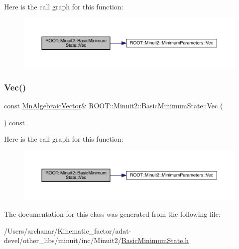 Here is the call graph for this function\+:
\nopagebreak
\begin{figure}[H]
\begin{center}
\leavevmode
\includegraphics[width=350pt]{d0/db1/classROOT_1_1Minuit2_1_1BasicMinimumState_a43ea742b5bd55d2c4e9d6b75308fb875_cgraph}
\end{center}
\end{figure}
\mbox{\label{classROOT_1_1Minuit2_1_1BasicMinimumState_a43ea742b5bd55d2c4e9d6b75308fb875}} 
\subsubsection{\texorpdfstring{Vec()}{Vec()}\hspace{0.1cm}{\footnotesize\ttfamily [3/3]}}
{\footnotesize\ttfamily const \mbox{\hyperlink{namespaceROOT_1_1Minuit2_a62ed97730a1ca8d3fbaec64a19aa11c9}{Mn\+Algebraic\+Vector}}\& R\+O\+O\+T\+::\+Minuit2\+::\+Basic\+Minimum\+State\+::\+Vec (\begin{DoxyParamCaption}{ }\end{DoxyParamCaption}) const\hspace{0.3cm}{\ttfamily [inline]}}

Here is the call graph for this function\+:
\nopagebreak
\begin{figure}[H]
\begin{center}
\leavevmode
\includegraphics[width=350pt]{d0/db1/classROOT_1_1Minuit2_1_1BasicMinimumState_a43ea742b5bd55d2c4e9d6b75308fb875_cgraph}
\end{center}
\end{figure}


The documentation for this class was generated from the following file\+:\begin{DoxyCompactItemize}
\item 
/\+Users/archanar/\+Kinematic\+\_\+factor/adat-\/devel/other\+\_\+libs/minuit/inc/\+Minuit2/\mbox{\hyperlink{adat-devel_2other__libs_2minuit_2inc_2Minuit2_2BasicMinimumState_8h}{Basic\+Minimum\+State.\+h}}\end{DoxyCompactItemize}
